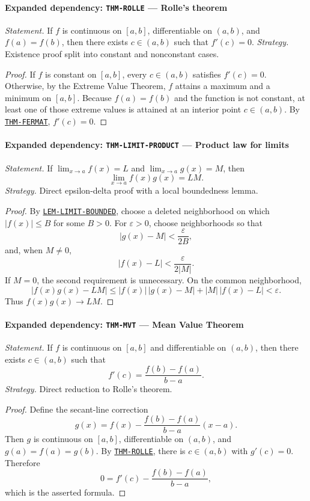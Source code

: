 \documentclass[10pt]{article}
\newcommand{\pidraw}[1]{\begingroup\urlstyle{tt}\nolinkurl{#1}\endgroup}
\newcommand{\pidref}[1]{\hyperref[prf:#1]{\pidraw{#1}}}
\newcommand{\pid}[1]{\pidref{#1}}
\theoremstyle{definition}
\theoremstyle{remark}
\begin{document}
\paragraph{Expanded dependency: \pidraw{THM-ROLLE} --- Rolle's theorem}
\textit{Statement.} If $f$ is continuous on $[a,b]$, differentiable on $(a,b)$, and $f(a)=f(b)$, then there exists $c\in(a,b)$ such that $f'(c)=0$.
\textit{Strategy.} Existence proof split into constant and nonconstant cases.
\begin{proof}If $f$ is constant on $[a,b]$, every $c\in(a,b)$ satisfies $f'(c)=0$.
Otherwise, by the Extreme Value Theorem, $f$ attains a maximum and a minimum
on $[a,b]$. Because $f(a)=f(b)$ and the function is not constant, at least one
of those extreme values is attained at an interior point $c\in(a,b)$.
By \pid{THM-FERMAT}, $f'(c)=0$.\end{proof}

\paragraph{Expanded dependency: \pidraw{THM-LIMIT-PRODUCT} --- Product law for limits}
\textit{Statement.} If $\lim_{x\to a}f(x)=L$ and $\lim_{x\to a}g(x)=M$, then
\[
\lim_{x\to a}f(x)g(x)=LM.
\]
\textit{Strategy.} Direct epsilon-delta proof with a local boundedness lemma.
\begin{proof}By \pid{LEM-LIMIT-BOUNDED}, choose a deleted neighborhood on which
$|f(x)|\le B$ for some $B>0$. For $\varepsilon>0$, choose neighborhoods so that
\[
|g(x)-M|<\frac{\varepsilon}{2B},
\]
and, when $M\ne0$,
\[
|f(x)-L|<\frac{\varepsilon}{2|M|}.
\]
If $M=0$, the second requirement is unnecessary. On the common neighborhood,
\[
|f(x)g(x)-LM|
\le |f(x)|\,|g(x)-M|+|M|\,|f(x)-L|<\varepsilon.
\]
Thus $f(x)g(x)\to LM$.\end{proof}

\paragraph{Expanded dependency: \pidraw{THM-MVT} --- Mean Value Theorem}
\textit{Statement.} If $f$ is continuous on $[a,b]$ and differentiable on $(a,b)$, then there exists $c\in(a,b)$ such that
\[
f'(c)=\frac{f(b)-f(a)}{b-a}.
\]
\textit{Strategy.} Direct reduction to Rolle's theorem.
\begin{proof}Define the secant-line correction
\[
g(x)=f(x)-\frac{f(b)-f(a)}{b-a}(x-a).
\]
Then $g$ is continuous on $[a,b]$, differentiable on $(a,b)$, and
$g(a)=f(a)=g(b)$. By \pid{THM-ROLLE}, there is $c\in(a,b)$ with $g'(c)=0$.
Therefore
\[
0=f'(c)-\frac{f(b)-f(a)}{b-a},
\]
which is the asserted formula.\end{proof}
\end{document}
